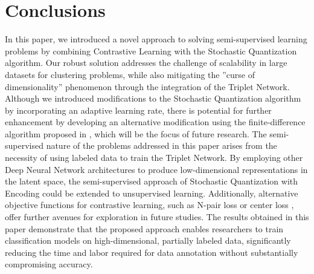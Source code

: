 \section{Conclusions}

In this paper, we introduced a novel approach to solving semi-supervised learning problems by combining Contrastive Learning with the Stochastic Quantization algorithm. Our robust solution addresses the challenge of scalability in large datasets for clustering problems, while also mitigating the ''curse of dimensionality'' phenomenon through the integration of the Triplet Network. Although we introduced modifications to the Stochastic Quantization algorithm by incorporating an adaptive learning rate, there is potential for further enhancement by developing an alternative modification using the finite-difference algorithm proposed in \cite{Norkin_Kozyriev_Norkin_2024}, which will be the focus of future research. The semi-supervised nature of the problems addressed in this paper arises from the necessity of using labeled data to train the Triplet Network. By employing other Deep Neural Network architectures to produce low-dimensional representations in the latent space, the semi-supervised approach of Stochastic Quantization with Encoding could be extended to unsupervised learning. Additionally, alternative objective functions for contrastive learning, such as N-pair loss \cite{Sohn_2016} or center loss \cite{qi2017}, offer further avenues for exploration in future studies. The results obtained in this paper demonstrate that the proposed approach enables researchers to train classification models on high-dimensional, partially labeled data, significantly reducing the time and labor required for data annotation without substantially compromising accuracy.
